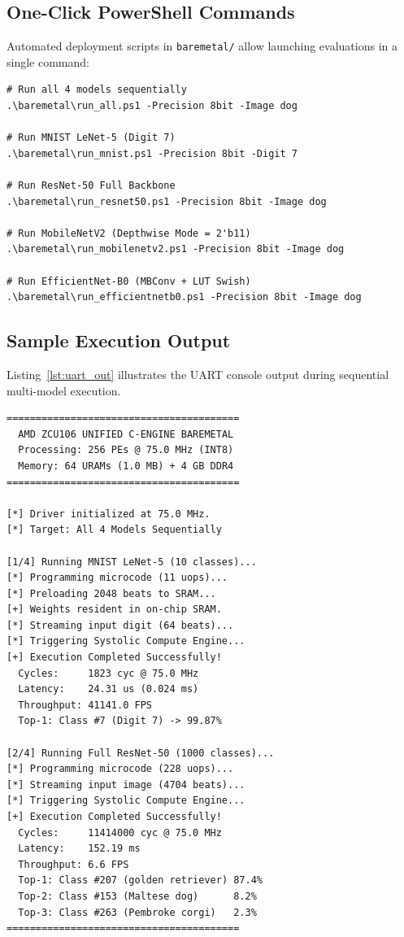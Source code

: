 \documentclass[10pt,journal,compsoc]{IEEEtran}
\begin{document}
\subsection{One-Click PowerShell Commands}
Automated deployment scripts in \texttt{baremetal/} allow launching evaluations in a single command:
\begin{lstlisting}
# Run all 4 models sequentially
.\baremetal\run_all.ps1 -Precision 8bit -Image dog

# Run MNIST LeNet-5 (Digit 7)
.\baremetal\run_mnist.ps1 -Precision 8bit -Digit 7

# Run ResNet-50 Full Backbone
.\baremetal\run_resnet50.ps1 -Precision 8bit -Image dog

# Run MobileNetV2 (Depthwise Mode = 2'b11)
.\baremetal\run_mobilenetv2.ps1 -Precision 8bit -Image dog

# Run EfficientNet-B0 (MBConv + LUT Swish)
.\baremetal\run_efficientnetb0.ps1 -Precision 8bit -Image dog
\end{lstlisting}

\subsection{Sample Execution Output}
Listing~\ref{lst:uart_out} illustrates the UART console output during sequential multi-model execution.

\begin{lstlisting}[caption={UART Console Output from AMD ZCU106 Multi-Model Inference.}, label={lst:uart_out}]
========================================
  AMD ZCU106 UNIFIED C-ENGINE BAREMETAL
  Processing: 256 PEs @ 75.0 MHz (INT8)
  Memory: 64 URAMs (1.0 MB) + 4 GB DDR4
========================================

[*] Driver initialized at 75.0 MHz.
[*] Target: All 4 Models Sequentially

[1/4] Running MNIST LeNet-5 (10 classes)...
[*] Programming microcode (11 uops)...
[*] Preloading 2048 beats to SRAM...
[+] Weights resident in on-chip SRAM.
[*] Streaming input digit (64 beats)...
[*] Triggering Systolic Compute Engine...
[+] Execution Completed Successfully!
  Cycles:     1823 cyc @ 75.0 MHz
  Latency:    24.31 us (0.024 ms)
  Throughput: 41141.0 FPS
  Top-1: Class #7 (Digit 7) -> 99.87%

[2/4] Running Full ResNet-50 (1000 classes)...
[*] Programming microcode (228 uops)...
[*] Streaming input image (4704 beats)...
[*] Triggering Systolic Compute Engine...
[+] Execution Completed Successfully!
  Cycles:     11414000 cyc @ 75.0 MHz
  Latency:    152.19 ms
  Throughput: 6.6 FPS
  Top-1: Class #207 (golden retriever) 87.4%
  Top-2: Class #153 (Maltese dog)      8.2%
  Top-3: Class #263 (Pembroke corgi)   2.3%
========================================
\end{lstlisting}
\end{document}
